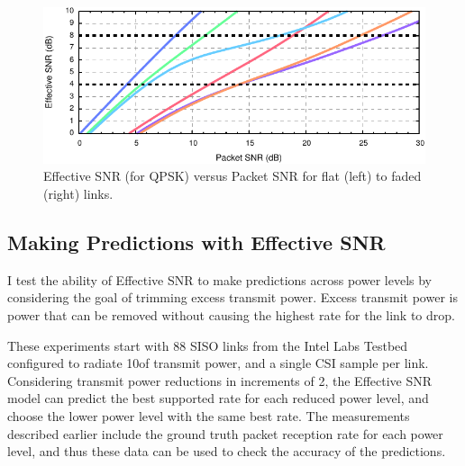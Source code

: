 \begin{figure}[t]
  \centering
  \includegraphics[width=\textwidth]{figures/eff_vs_snr_qpsk.pdf}
  \caption[Effective SNR vs Packet SNR for four faded links]{Effective SNR (for QPSK) versus Packet SNR for flat (left) to faded (right) links.}
  \label{fig:eff_vs_rssi}
\end{figure}

\subsection{Making Predictions with Effective SNR}
I test the ability of Effective SNR to make predictions across power levels by considering the goal of trimming excess transmit power. Excess transmit power is power that can be removed without causing the highest rate for the link to drop.

These experiments start with 88 SISO links from the Intel Labs Testbed configured to radiate 10\mW of transmit power, and a single CSI sample per link. Considering transmit power reductions in increments of 2\dB, the Effective SNR model can predict the best supported rate for each reduced power level, and choose the lower power level with the same best rate. The measurements described earlier include the ground truth packet reception rate for each power level, and thus these data can be used to check the accuracy of the predictions.

